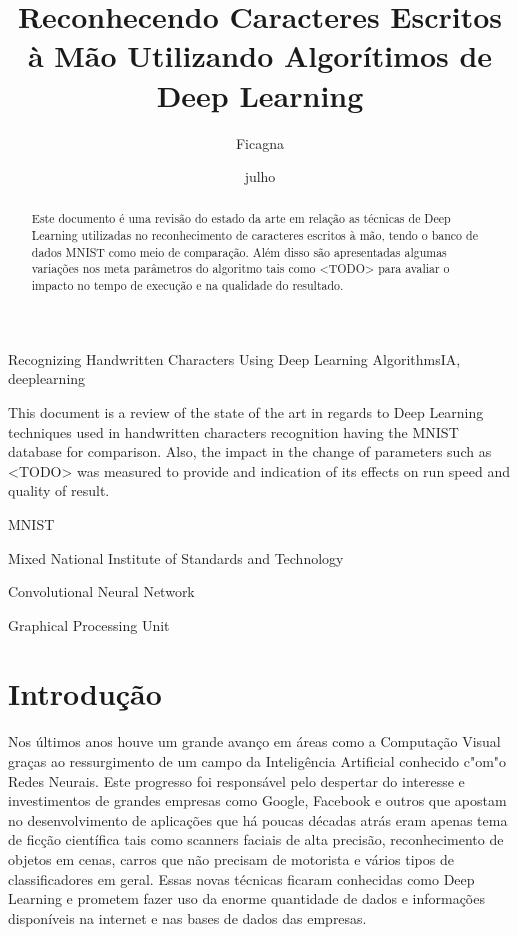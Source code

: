 \documentclass[cic,tc]{iiufrgs}
\title{Reconhecendo Caracteres Escritos à Mão Utilizando Algorítimos de Deep Learning}
\author{Ficagna}{Alan}
\date{julho}{2015}
\begin{document}
\maketitle

\begin{abstract}

  Este documento é uma revisão do estado da arte em relação as técnicas de
Deep Learning utilizadas no reconhecimento de caracteres escritos à mão, tendo o
banco de dados MNIST como meio de comparação. Além disso são apresentadas
algumas variações nos meta parâmetros do algoritmo tais como <TODO> para
avaliar o impacto no tempo de execução e na qualidade do resultado.
\end{abstract}

\begin{englishabstract}{Recognizing Handwritten Characters Using Deep Learning Algorithms}{IA, deeplearning} %

  This document is a review of the state of the art in regards to Deep Learning
techniques used in handwritten characters recognition having the MNIST
database for comparison. Also, the impact in the change of parameters such as
<TODO> was measured to provide and indication of its effects on run speed and
quality of result.

\end{englishabstract}

\listoffigures
\listoftables
\begin{listofabbrv}{MNIST} %
 \item[MNIST] Mixed National Institute of Standards and Technology
 \item[CNN] Convolutional Neural Network
 \item[GPU] Graphical Processing Unit
\end{listofabbrv}
\tableofcontents

\chapter{Introdução}

Nos últimos anos houve um grande avanço em áreas como a Computação
Visual graças ao ressurgimento de um campo da Inteligência Artificial conhecido
c"om"o Redes Neurais. Este progresso foi responsável pelo despertar do interesse
e investimentos de grandes empresas como Google, Facebook e outros que apostam
no desenvolvimento de aplicações que há poucas décadas atrás eram apenas tema
de ficção científica tais como scanners faciais de alta precisão,
reconhecimento de objetos em cenas, carros que não precisam de motorista e
vários tipos de classificadores em geral. Essas novas técnicas ficaram
conhecidas como Deep Learning e prometem fazer uso da enorme quantidade de
dados e informações disponíveis na internet e nas bases de dados das empresas.
\end{document}
